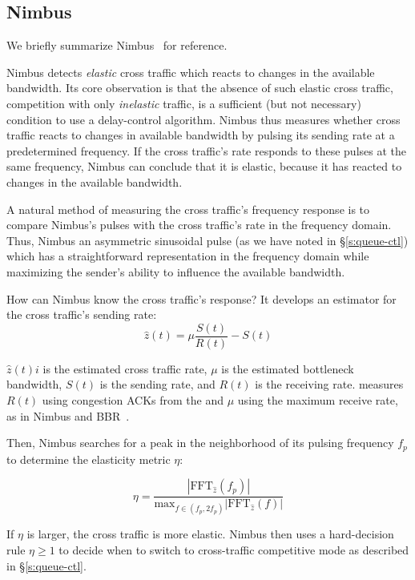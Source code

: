 \begin{Appendix}
\section{Nimbus}\label{s:app:nimbus}

We briefly summarize Nimbus~\cite{nimbus} for reference.

Nimbus detects \emph{elastic} cross traffic which reacts to changes in the available bandwidth. Its core observation is that the absence of such elastic cross traffic, \ie competition with only \emph{inelastic} traffic, is a sufficient (but not necessary) condition to use a delay-control algorithm.
Nimbus thus measures whether cross traffic reacts to changes in available bandwidth by pulsing its sending rate at a predetermined frequency.
If the cross traffic's rate responds to these pulses at the same frequency, Nimbus can conclude that it is elastic, because it has reacted to changes in the available bandwidth.

A natural method of measuring the cross traffic's frequency response is to compare Nimbus's pulses with the cross traffic's rate in the frequency domain.
Thus, Nimbus an asymmetric sinusoidal pulse (as we have noted in \S\ref{s:queue-ctl}) which has a straightforward representation in the frequency domain while maximizing the sender's ability to influence the available bandwidth.

How can Nimbus know the cross traffic's response? It develops an estimator for the cross traffic's sending rate:
\begin{equation}
    \hat{z}(t) = \mu\frac{S(t)}{R(t)} - S(t)
\end{equation}

$\hat{z}(t)i$ is the estimated cross traffic rate, $\mu$ is the estimated bottleneck bandwidth, $S(t)$ is the sending rate, and $R(t)$ is the receiving rate. 
\name measures $R(t)$ using congestion ACKs from the \outbox and $\mu$ using the maximum receive rate, as in Nimbus and BBR~\cite{bbr}.

Then, Nimbus searches for a peak in the neighborhood of its pulsing frequency $f_p$ to determine the elasticity metric $\eta$:

\begin{equation}
    \eta = \frac{|\text{FFT}_{\hat{z}}(f_p)|}{\text{max}_{f \in (f_p, 2f_p)} |\text{FFT}_{\hat{z}}(f)|}
\end{equation}

If $\eta$ is larger, the cross traffic is more elastic.
Nimbus then uses a hard-decision rule $\eta \ge 1$ to decide when to switch to cross-traffic competitive mode as described in \S\ref{s:queue-ctl}.

\end{Appendix}
